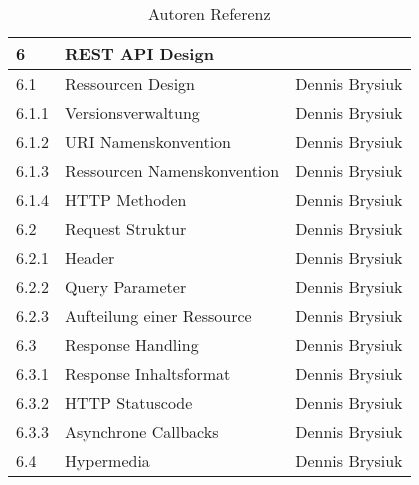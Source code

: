 \begin{table}[H]
\begin{center}
\begin{tabular}{| l | l | l |}
\hline    
\rowcolor{LGray}
\textbf{6}		& \textbf{REST API Design}	&  				\\
\hline
6.1		& Ressourcen Design				& Dennis Brysiuk \\
\hline
6.1.1	& Versionsverwaltung			& Dennis Brysiuk \\
\hline
6.1.2	& URI Namenskonvention			& Dennis Brysiuk \\
\hline
6.1.3	& Ressourcen Namenskonvention	& Dennis Brysiuk \\
\hline
6.1.4	& HTTP Methoden					& Dennis Brysiuk \\
\hline
6.2		& Request Struktur				& Dennis Brysiuk \\
\hline
6.2.1	& Header						& Dennis Brysiuk \\
\hline
6.2.2	& Query Parameter				& Dennis Brysiuk \\
\hline
6.2.3	& Aufteilung einer Ressource	& Dennis Brysiuk \\
\hline
6.3		& Response Handling				& Dennis Brysiuk \\
\hline
6.3.1	& Response Inhaltsformat		& Dennis Brysiuk \\
\hline
6.3.2	& HTTP Statuscode				& Dennis Brysiuk \\
\hline
6.3.3	& Asynchrone Callbacks			& Dennis Brysiuk \\
\hline
6.4		& Hypermedia					& Dennis Brysiuk \\

\hline
  \end{tabular}
  \end{center}
\caption[Autoren Referenz]{Autoren Referenz}
\label{tab:autoren}
\end{table}

\newpage

